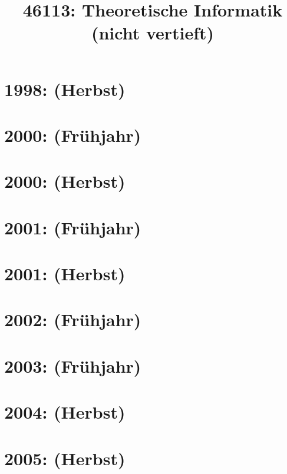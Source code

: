 \documentclass{lehramt-informatik-haupt}
\title{46113: Theoretische Informatik (nicht vertieft)}
\begin{document}
\maketitle
\tableofcontents

\section{1998: (Herbst)}


\section{2000: (Frühjahr)}


\section{2000: (Herbst)}


\section{2001: (Frühjahr)}


\section{2001: (Herbst)}


\section{2002: (Frühjahr)}


\section{2003: (Frühjahr)}


\section{2004: (Herbst)}


\section{2005: (Herbst)}

\end{document}
